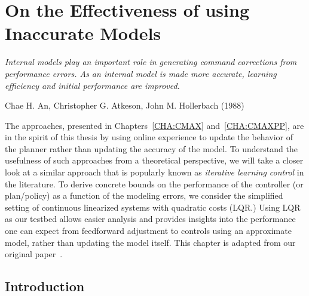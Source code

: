 \chapter{On the Effectiveness of using Inaccurate Models}
\label{CHA:ILC}

\epigraph{\textit{Internal models play an important role in generating
    command corrections from performance errors. As an internal model
    is made more accurate, learning efficiency and initial performance
    are improved.}}{Chae H. An, Christopher G. Atkeson, John
  M. Hollerbach (1988)}

The approaches, presented in Chapters~\ref{CHA:CMAX}
and~\ref{CHA:CMAXPP}, are
in the spirit of this thesis by using online experience to update the
behavior of the planner rather than updating the accuracy of the
model. To understand the usefulness of such approaches from a
theoretical perspective, we will take a closer look at a similar
approach that is popularly known as \textit{iterative learning
  control} in the literature. To derive concrete bounds on the
performance of the controller (or plan/policy) as a function of the
modeling errors, we consider the simplified setting of continuous
linearized systems with quadratic costs (LQR.) Using LQR as our
testbed allows easier analysis and provides insights into the
performance one can expect from feedforward adjustment to controls
using an approximate model, rather than updating the model itself. This chapter
is adapted from our original paper~\cite{ilc}.

\section{Introduction}
\label{sec:intro}

